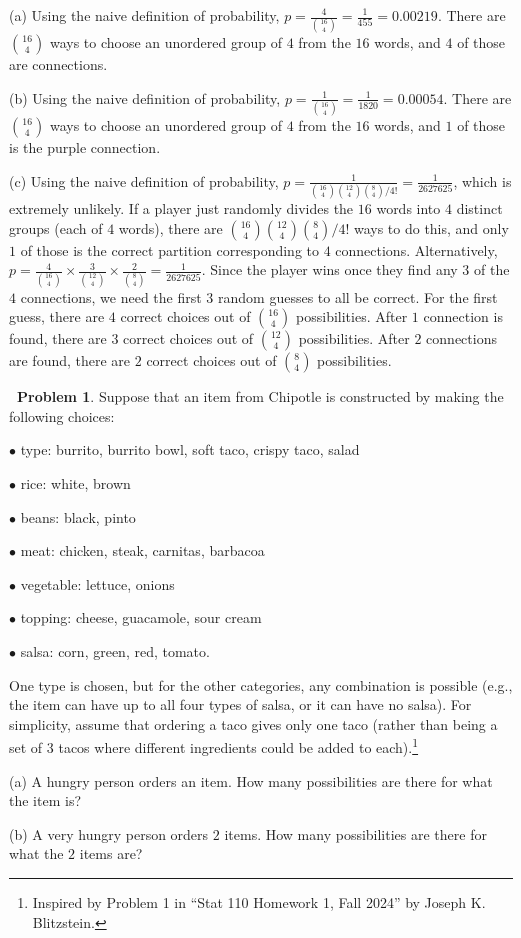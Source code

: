 \documentclass[12pt,oneside]{article}
\theoremstyle{definition}
\newtheorem{problem}{\faPen \ Problem}
\theoremstyle{remark}
\begin{document}
\begin{solutionbox}
(a) Using the naive definition of probability, $p = \frac{4}{\binom{16}{4}} = \frac{1}{455} = 0.00219$. There are $\binom{16}{4}$ ways to choose an unordered group of $4$ from the $16$ words, and $4$ of those are connections.

(b) Using the naive definition of probability, $p = \frac{1}{\binom{16}{4}} = \frac{1}{1820} = 0.00054$. There are $\binom{16}{4}$ ways to choose an unordered group of $4$ from the $16$ words, and $1$ of those is the purple connection.

(c) Using the naive definition of probability, $p = \frac{1}{\binom{16}{4} \binom{12}{4} \binom{8}{4} / 4!} = \frac{1}{2627625}$, which is extremely unlikely. If a player just randomly divides the $16$ words into $4$ distinct groups (each of $4$ words), there are $\binom{16}{4} \binom{12}{4} \binom{8}{4} / 4!$ ways to do this, and only $1$ of those is the correct partition corresponding to $4$ connections. Alternatively, $p = \frac{4}{\binom{16}{4}} \times \frac{3}{\binom{12}{4}} \times \frac{2}{\binom{8}{4}} = \frac{1}{2627625}$. Since the player wins once they find any $3$ of the $4$ connections, we need the first $3$ random guesses to all be correct. For the first guess, there are $4$ correct choices out of $\binom{16}{4}$ possibilities. After $1$ connection is found, there are $3$ correct choices out of $\binom{12}{4}$ possibilities. After $2$ connections are found, there are $2$ correct choices out of $\binom{8}{4}$ possibilities.
\end{solutionbox}

\begin{problem}
Suppose that an item from Chipotle is constructed by making the following choices:

$\bullet$ type: burrito, burrito bowl, soft taco, crispy taco, salad

$\bullet$ rice: white, brown

$\bullet$ beans: black, pinto

$\bullet$ meat: chicken, steak, carnitas, barbacoa

$\bullet$ vegetable: lettuce, onions

$\bullet$ topping: cheese, guacamole, sour cream

$\bullet$ salsa: corn, green, red, tomato.

One type is chosen, but for the other categories, any combination is possible (e.g., the item can have up to all four types of salsa, or it can have no salsa). For simplicity, assume that ordering a taco gives only one taco (rather than being a set of $3$ tacos where different ingredients could be added to each).\footnote{Inspired by Problem 1 in \enquote{Stat 110 Homework 1, Fall 2024} by Joseph K. Blitzstein.}

(a) A hungry person orders an item. How many possibilities are there for what the item is?

(b) A very hungry person orders $2$ items. How many possibilities are there for what the $2$ items are?
\end{problem}
\end{document}
